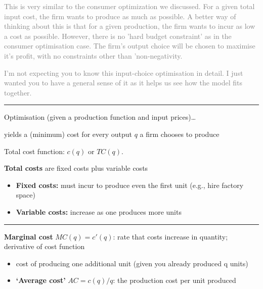 \documentclass[]{article}
\providecommand{\tightlist}{%
  \setlength{\itemsep}{0pt}\setlength{\parskip}{0pt}}
\begin{document}
\bigskip

\textcolor{gray}{This is very similar to the consumer optimization we discussed. For a given total input cost, the firm wants to produce as much as possible. A better way of thinking about this is that for a given production, the firm wants to incur as low a cost as possible. However, there is no 'hard budget constraint' as in the consumer optimisation case. The firm's output choice will be chosen to maximise it's profit, with no constraints other than 'non-negativity. }

\textcolor{gray}{ I'm not expecting you to know this input-choice optimisation in detail. I just wanted you to have a general sense of it as it helps us see how the model fits together.}

\begin{center}\rule{0.5\linewidth}{\linethickness}\end{center}

Optimisation (given a production function and input prices)\ldots{}

yields a (minimum) cost for every output \(q\) a firm chooses to produce

\bigskip

Total cost function: \(c(q)\) or \(TC(q)\).

\textbf{Total costs} are fixed costs plus variable costs

\begin{itemize}
\item
  \textbf{Fixed costs:} must incur to produce even the first unit (e.g.,
  hire factory space)
\item
  \textbf{Variable costs:} increase as one produces more units
\end{itemize}

\begin{center}\rule{0.5\linewidth}{\linethickness}\end{center}

\textbf{Marginal cost} \(MC(q)=c'(q)\): rate that costs increase in
quantity; derivative of cost function

\begin{itemize}
\tightlist
\item
  cost of producing one additional unit (given you already produced q
  units)
\end{itemize}

\bigskip

\bigskip

\begin{itemize}
\tightlist
\item
  \textbf{`Average cost'} \(AC=c(q)/q\): the production cost per unit
  produced
\end{itemize}
\end{document}
